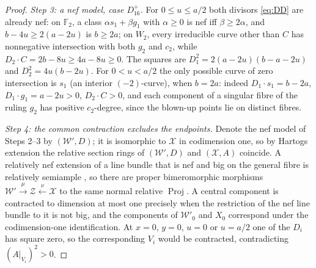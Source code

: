 \documentclass[11pt]{article}
\newcommand{\F}{\mathbb F}
\newcommand{\calX}{\mathcal X}
\newcommand{\calW}{\mathcal W}
\newcommand{\calZ}{\mathcal Z}
\theoremstyle{definition}
\theoremstyle{remark}
\begin{document}
\begin{proof}
\emph{Step 3: a nef model, case \(D_{16}^+\).}
For \(0\leq u\leq a/2\) both divisors \eqref{eq:DD} are already nef:
on \(\F_2\), a class \(\alpha s_1+\beta g_1\) with \(\alpha\geq0\) is
nef iff \(\beta\geq2\alpha\), and \(b-4u\geq2(a-2u)\) is
\(b\geq2a\); on \(W_2\), every irreducible curve other than \(C\) has
nonnegative intersection with both \(g_2\) and \(c_2\), while
\(D_2\cdot C=2b-8u\geq4a-8u\geq0\). The squares are
\(D_1^2=2(a-2u)(b-a-2u)\) and \(D_2^2=4u(b-2u)\).
For \(0<u<a/2\) the only possible curve of zero intersection is
\(s_1\) (an interior \((-2)\)-curve), when \(b=2a\): indeed
\(D_1\cdot s_1=b-2a\), \(D_1\cdot g_1=a-2u>0\), \(D_2\cdot C>0\), and
each component of a singular fibre of the ruling \(g_2\) has positive
\(c_2\)-degree, since the blown-up points lie on distinct fibres.

\emph{Step 4: the common contraction excludes the endpoints.}
Denote the nef model of Steps 2--3 by \((\calW',D)\); it is isomorphic
to \(\calX\) in codimension one, so by Hartogs extension the relative
section rings of \((\calW',D)\) and \((\calX,A)\) coincide. A
relatively nef extension of a line bundle that is nef and big on the
general fibre is relatively semiample \cite[\S2A]{ABE}, so there are
proper bimeromorphic morphisms
\(\calW'\xrightarrow{\,\mu\,}\calZ\xleftarrow{\,\nu\,}\calX\) to the same
normal relative \(\operatorname{Proj}\). A central component is
contracted to dimension at most one precisely when the restriction of
the nef line bundle to it is not big, and the components of
\(\calW'_0\) and \(X_0\) correspond under the codimension-one
identification. At \(x=0\), \(y=0\), \(u=0\) or \(u=a/2\) one of the
\(D_i\) has square zero, so the corresponding \(V_i\) would be
contracted, contradicting \((A|_{V_i})^2>0\).


\end{proof}
\end{document}
